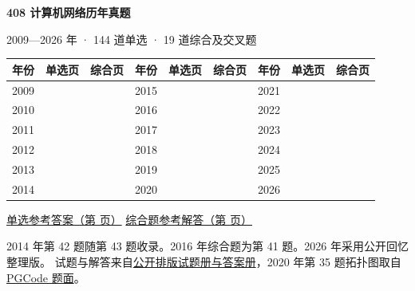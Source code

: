 \documentclass[UTF8,a4paper,11pt]{ctexart}
\newcommand{\PageJump}[1]{\hyperref[#1]{\pageref*{#1}}}
\newcommand{\IndexYear}[1]{#1 & \PageJump{choice:#1} & \PageJump{big:#1}}
\begin{document}
\thispagestyle{plain}
{\LARGE\bfseries 408 计算机网络历年真题\par}
\vskip4pt
{\small\color{muted}2009—2026 年 · 144 道单选 · 19 道综合及交叉题\par}
\vskip9pt

\begingroup
\small
\renewcommand{\arraystretch}{1.10}
\begin{tabular*}{\linewidth}{@{\extracolsep{\fill}}rccrccrcc@{}}
\toprule
年份 & 单选页 & 综合页 & 年份 & 单选页 & 综合页 & 年份 & 单选页 & 综合页 \\
\midrule
\IndexYear{2009} & \IndexYear{2015} & \IndexYear{2021} \\
\IndexYear{2010} & \IndexYear{2016} & \IndexYear{2022} \\
\IndexYear{2011} & \IndexYear{2017} & \IndexYear{2023} \\
\IndexYear{2012} & \IndexYear{2018} & \IndexYear{2024} \\
\IndexYear{2013} & \IndexYear{2019} & \IndexYear{2025} \\
\IndexYear{2014} & \IndexYear{2020} & \IndexYear{2026} \\
\bottomrule
\end{tabular*}
\endgroup
\vskip6pt
{\small
\hyperref[choice-answer]{单选参考答案（第 \pageref*{choice-answer} 页）}
\quad
\hyperref[big-answer]{综合题参考解答（第 \pageref*{big-answer} 页）}\par}
\vskip5pt
{\small\color{muted}
2014 年第 42 题随第 43 题收录。2016 年综合题为第 41 题。2026 年采用公开回忆整理版。
试题与解答来自\href{https://eze-root.github.io/408/assignments/}{公开排版试题册与答案册}，2020 年第 35 题拓扑图取自\href{https://pgcode.cn/exams/408/years/2020/preview}{PGCode 题面}。\par}
\end{document}
